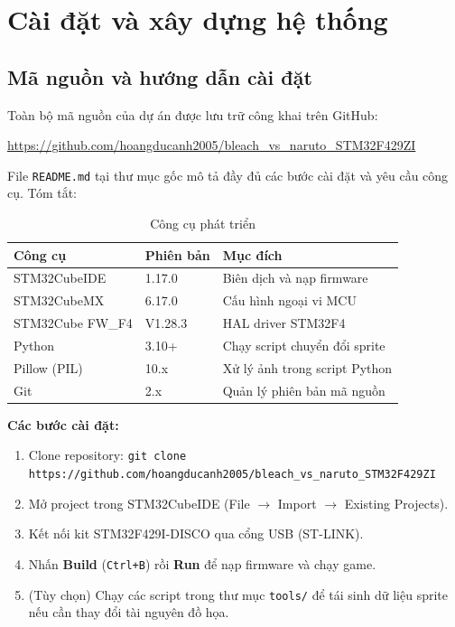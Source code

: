 \documentclass[a4paper,12pt]{report}
\begin{document}
\chapter{Cài đặt và xây dựng hệ thống}

\section{Mã nguồn và hướng dẫn cài đặt}

Toàn bộ mã nguồn của dự án được lưu trữ công khai trên GitHub:

\begin{center}
    \url{https://github.com/hoangducanh2005/bleach_vs_naruto_STM32F429ZI}
\end{center}

\noindent File \texttt{README.md} tại thư mục gốc mô tả đầy đủ các bước cài đặt và yêu cầu công cụ. Tóm tắt:

\begin{table}[H]
\centering
\caption{Công cụ phát triển}
\begin{tabular}{l l l}
\toprule
\textbf{Công cụ} & \textbf{Phiên bản} & \textbf{Mục đích} \\
\midrule
STM32CubeIDE & 1.17.0 & Biên dịch và nạp firmware \\
STM32CubeMX & 6.17.0 & Cấu hình ngoại vi MCU \\
STM32Cube FW\_F4 & V1.28.3 & HAL driver STM32F4 \\
Python & 3.10+ & Chạy script chuyển đổi sprite \\
Pillow (PIL) & 10.x & Xử lý ảnh trong script Python \\
Git & 2.x & Quản lý phiên bản mã nguồn \\
\bottomrule
\end{tabular}
\end{table}

\noindent\textbf{Các bước cài đặt:}
\begin{enumerate}
    \item Clone repository: \texttt{git clone https://github.com/hoangducanh2005/bleach\_vs\_naruto\_STM32F429ZI}
    \item Mở project trong STM32CubeIDE (File $\to$ Import $\to$ Existing Projects).
    \item Kết nối kit STM32F429I-DISCO qua cổng USB (ST-LINK).
    \item Nhấn \textbf{Build} (\texttt{Ctrl+B}) rồi \textbf{Run} để nạp firmware và chạy game.
    \item (Tùy chọn) Chạy các script trong thư mục \texttt{tools/} để tái sinh dữ liệu sprite nếu cần thay đổi tài nguyên đồ họa.
\end{enumerate}
\end{document}
